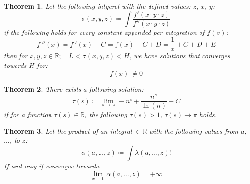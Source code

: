\documentclass[10pt, twocolumn]{article}
\theoremstyle{plain}
\newtheorem{theorem}{Theorem}[section]
\theoremstyle{definition}
\theoremstyle{remark}
\begin{document}
\begin{theorem}
  Let the following intgeral with the defined values: $z$, $x$, $y$:
  \begin{equation}
    \sigma(x, y, z) \coloneq \int \frac{f'(x \cdot y \cdot z)}{f''(x \cdot y \cdot z)}
  \end{equation}
  if the following holds for every constant appended per integration of $f(x)$:
  \begin{equation}
    f\:''\left(x\right)= f\:'\left(x\right)+C=f\left(x\right)+C + D=\frac{1}{x} + C + D + E
  \end{equation}
  then for $x, y, z \in \mathbb{R}; \quad L < \sigma(x, y, z) < H$, we have solutions that converges towards $H$ for:
  \begin{equation}
    f\left(x\right)\:\ne 0
  \end{equation}
\end{theorem}

\begin{theorem}
  There exists a following solution:
  \begin{equation}
    \tau (s) \coloneq \lim _{s\to \:\pi } -n^s+\frac{n^s}{\ln \left(n\right)}+C
  \end{equation}
  if for a function $\tau (s) \in \mathbb{R}$, the following $\tau (s) > 1$, $\tau (s) \to \pi$ holds.
\end{theorem}

\begin{theorem}
  Let the product of an integral $\in \mathbb{R}$ with the following values from $a$, $\dots$, to $z$:
  \begin{equation}
    \alpha(a, \dots, z) \coloneq \int \lambda(a, \dots, z)! 
  \end{equation}
  If and only if converges towards:
  \begin{equation}
    \lim_{x \to 0} \alpha(a, \dots, z) = +\infty
  \end{equation}
\end{theorem}
\end{document}

